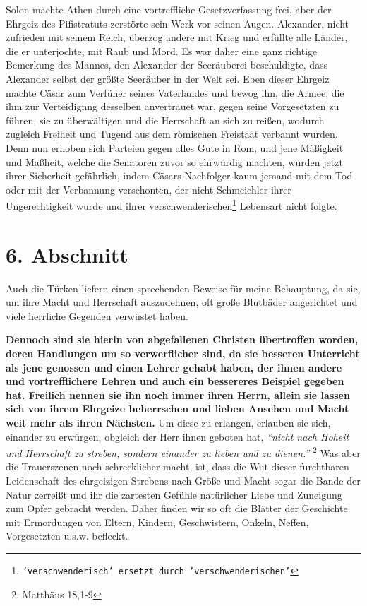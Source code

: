 \medskip

Solon machte Athen durch eine vortreffliche Gesetzverfassung frei, aber der
Ehrgeiz des Pifistratuts zerstörte sein Werk vor seinen Augen. Alexander, nicht
zufrieden mit seinem Reich, überzog andere mit Krieg und erfüllte alle Länder,
die er unterjochte, mit Raub und Mord. Es war daher eine ganz richtige Bemerkung
des Mannes, den Alexander der Seeräuberei beschuldigte, dass Alexander selbst
der größte Seeräuber in der Welt sei. Eben dieser Ehrgeiz machte Cäsar zum
Verfüher seines Vaterlandes und bewog ihn, die Armee, die ihm zur
Verteidignng desselben anvertrauet war, gegen seine Vorgesetzten zu führen, sie
zu überwältigen und die Herrschaft an sich zu reißen, wodurch zugleich Freiheit
und Tugend aus dem römischen Freistaat verbannt wurden. Denn nun erhoben sich
Parteien gegen alles Gute in Rom, und jene Mäßigkeit und Maßheit, welche die
Senatoren zuvor so ehrwürdig machten, wurden jetzt ihrer Sicherheit gefährlich,
indem Cäsars Nachfolger kaum jemand mit dem Tod oder mit der Verbannung
verschonten, der nicht Schmeichler ihrer Ungerechtigkeit wurde und ihrer
verschwenderischen\footnote{\texttt{'verschwenderisch' ersetzt durch 'verschwenderischen'}} Lebensart nicht folgte.

\section{6. Abschnitt} \label{kap8_ab6}

Auch die Türken liefern einen sprechenden Beweise für meine Behauptung, da sie,
um ihre Macht und Herrschaft auszudehnen, oft große Blutbäder angerichtet und
viele herrliche Gegenden verwüstet haben.

\medskip

\textbf{Dennoch sind sie hierin von abgefallenen Christen übertroffen worden, deren
Handlungen um so verwerflicher sind, da sie besseren Unterricht als jene genossen
und einen Lehrer gehabt haben, der ihnen andere und vortrefflichere Lehren und
auch ein bessereres Beispiel gegeben hat. Freilich nennen sie ihn noch immer ihren
Herrn, allein sie lassen sich von ihrem Ehrgeize beherrschen und lieben Ansehen
und Macht weit mehr als ihren Nächsten.} Um diese zu erlangen, erlauben sie sich,
einander zu erwürgen,  obgleich der Herr ihnen geboten hat,
\textit{"`nicht nach Hoheit
und Herrschaft zu streben, sondern einander zu lieben und zu
dienen."'}
\footnote{Matthäus 18,1-9}
Was aber die Trauerszenen noch schrecklicher
macht, ist, dass die Wut dieser furchtbaren Leidenschaft des ehrgeizigen
Strebens nach Größe und Macht sogar die Bande der Natur zerreißt und ihr die
zartesten Gefühle natürlicher Liebe und Zuneigung zum Opfer gebracht werden.
Daher finden wir so oft die Blätter der Geschichte mit Ermordungen von Eltern,
Kindern, Geschwistern, Onkeln, Neffen, Vorgesetzten u.s.w. befleckt.

